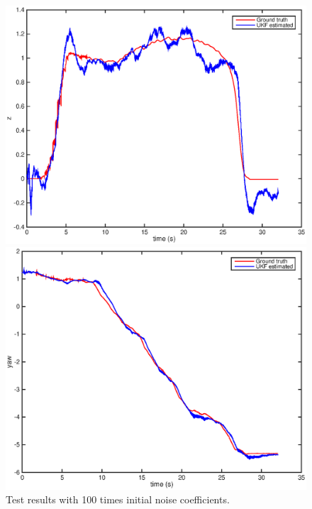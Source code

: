 \documentclass[letter, 10pt]{article}
\begin{document}
\begin{onehalfspacing}
\begin{figure}[h]
\begin{minipage}{.25\textwidth}
    		\includegraphics[width=1\linewidth]{i_z.eps}
	\end{minipage}%
	\begin{minipage}{.25\textwidth}  
		\centering
    		\includegraphics[width=1\linewidth]{i_yaw.eps}
	\end{minipage}
	\centering
	\caption{Test results with 100 times initial noise coefficients.}
	\label{highi}
\end{figure}


\end{onehalfspacing}
\end{document}
